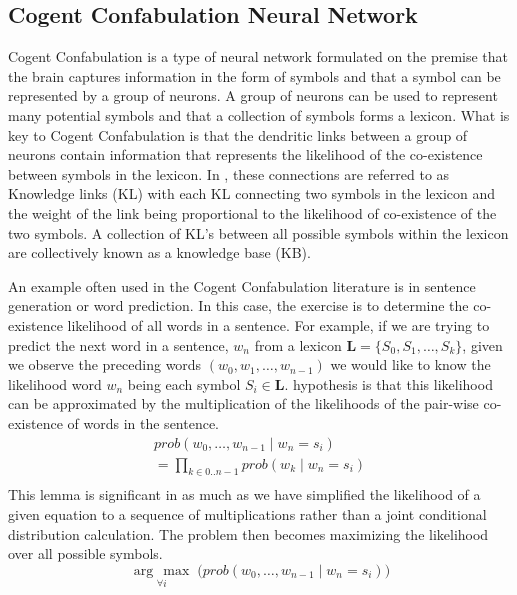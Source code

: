 \documentclass[journal]{IEEEtran}
\newcommand{\argmax}[1]{\underset{#1}{\operatorname{arg}\,\operatorname{max}}\;}
\begin{document}
\subsection{Cogent Confabulation Neural Network}
\label{sec:Cogent Confabulation Neural Network}

Cogent Confabulation is a type of neural network formulated on the premise that the brain captures information in the form of symbols and that
a symbol can be represented by a group of neurons. A group of neurons can be used to represent many potential symbols and that 
a collection of symbols forms a lexicon.
What is key to Cogent Confabulation is that the dendritic links between a group of neurons contain information that
represents the likelihood of the co-existence between symbols in the lexicon. 
In \cite{HechtBOOK}\cite{Hecht2005}, these connections are referred to as Knowledge links (KL) with each KL connecting two symbols in the lexicon 
and the weight of the link being proportional to the likelihood of co-existence of the two symbols.
A collection of KL's between all possible symbols within the lexicon are collectively known as a knowledge base (KB).

An example often used in the Cogent Confabulation literature is in sentence generation or word prediction.
In this case, the exercise is to determine the co-existence likelihood of all words in a sentence. For example, if we are
trying to predict the next word in a sentence, $w_n$ from a lexicon  $\mathbf{L}=\{S_0, S_1, \dots ,S_k\} $, given we observe 
the preceding words  $(w_0, w_1, \dots ,w_{n-1})$ we would like to know the likelihood word $w_n$ being each symbol $S_i\in\mathbf{L}$.
\cite{Hecht2005} hypothesis is that this likelihood can be approximated by the multiplication of the likelihoods of the pair-wise co-existence
of words in the sentence. 
\begin{equation}
\label{eq:Likelihood Equation}
\begin{split}
prob(w_0,\dots ,w_{n-1} \mid w_n = s_i) \\
=\prod_{k \in {0..n-1}} prob(w_k\mid w_n = s_i ) \\
\end{split}
\end{equation}
This lemma is significant in as much as we have simplified the likelihood of a given equation to a sequence of multiplications
rather than a joint conditional distribution calculation.
The problem then becomes maximizing the likelihood over all possible symbols.
\begin{equation}
\argmax{\forall i} \big ( prob(w_0,\dots ,w_{n-1} \mid w_n = s_i )\big )
\end{equation}
\end{document}
